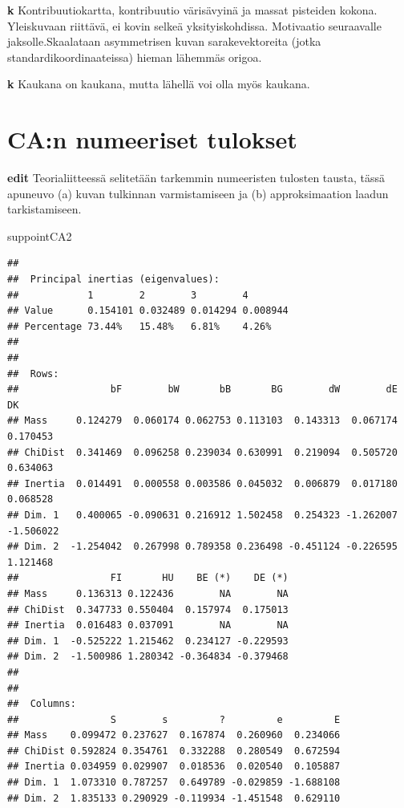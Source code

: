 \documentclass[
  finnish,
]{book}
\newenvironment{Shaded}{\begin{snugshade}}{\end{snugshade}}
\newcommand{\NormalTok}[1]{#1}
\begin{document}
\textbf{k} Kontribuutiokartta, kontribuutio värisävyinä ja massat pisteiden kokona.
Yleiskuvaan riittävä, ei kovin selkeä yksityiskohdissa. Motivaatio seuraavalle
jaksolle.Skaalataan asymmetrisen kuvan sarakevektoreita (jotka standardikoordinaateissa)
hieman lähemmäs origoa.

\textbf{k} Kaukana on kaukana, mutta lähellä voi olla myös kaukana.

\hypertarget{can-numeeriset-tulokset}{%
\section{CA:n numeeriset tulokset}\label{can-numeeriset-tulokset}}

\textbf{edit} Teorialiitteessä selitetään tarkemmin numeeristen tulosten tausta, tässä
apuneuvo (a) kuvan tulkinnan varmistamiseen ja (b) approksimaation laadun
tarkistamiseen.

\begin{Shaded}
\begin{Highlighting}[]
\NormalTok{suppointCA2}
\end{Highlighting}
\end{Shaded}

\begin{verbatim}
## 
##  Principal inertias (eigenvalues):
##            1        2        3        4       
## Value      0.154101 0.032489 0.014294 0.008944
## Percentage 73.44%   15.48%   6.81%    4.26%   
## 
## 
##  Rows:
##                bF        bW       bB       BG        dW        dE        DK
## Mass     0.124279  0.060174 0.062753 0.113103  0.143313  0.067174  0.170453
## ChiDist  0.341469  0.096258 0.239034 0.630991  0.219094  0.505720  0.634063
## Inertia  0.014491  0.000558 0.003586 0.045032  0.006879  0.017180  0.068528
## Dim. 1   0.400065 -0.090631 0.216912 1.502458  0.254323 -1.262007 -1.506022
## Dim. 2  -1.254042  0.267998 0.789358 0.236498 -0.451124 -0.226595  1.121468
##                FI       HU    BE (*)    DE (*)
## Mass     0.136313 0.122436        NA        NA
## ChiDist  0.347733 0.550404  0.157974  0.175013
## Inertia  0.016483 0.037091        NA        NA
## Dim. 1  -0.525222 1.215462  0.234127 -0.229593
## Dim. 2  -1.500986 1.280342 -0.364834 -0.379468
## 
## 
##  Columns:
##                S        s         ?         e         E
## Mass    0.099472 0.237627  0.167874  0.260960  0.234066
## ChiDist 0.592824 0.354761  0.332288  0.280549  0.672594
## Inertia 0.034959 0.029907  0.018536  0.020540  0.105887
## Dim. 1  1.073310 0.787257  0.649789 -0.029859 -1.688108
## Dim. 2  1.835133 0.290929 -0.119934 -1.451548  0.629110
\end{verbatim}
\end{document}
